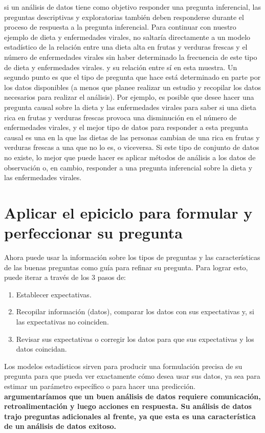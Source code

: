 \documentclass[10pt]{book}
\begin{document}
si un análisis de datos tiene como objetivo responder una pregunta inferencial, las preguntas descriptivas y exploratorias también deben responderse durante el proceso de respuesta a la pregunta inferencial. Para continuar con nuestro ejemplo de dieta y enfermedades virales, no saltaría directamente a un modelo estadístico de la relación entre una dieta alta en frutas y verduras frescas y el número de enfermedades virales sin haber determinado la frecuencia de este tipo de dieta y enfermedades virales. y su relación entre sí en esta muestra. Un segundo punto es que el tipo de pregunta que hace está determinado en parte por los datos disponibles (a menos que planee realizar un estudio y recopilar los datos necesarios para realizar el análisis). Por ejemplo, es posible que desee hacer una pregunta causal sobre la dieta y las enfermedades virales para saber si una dieta rica en frutas y verduras frescas provoca una disminución en el número de enfermedades virales, y el mejor tipo de datos para responder a esta pregunta causal es una en la que las dietas de las personas cambian de una rica en frutas y verduras frescas a una que no lo es, o viceversa. Si este tipo de conjunto de datos no existe, lo mejor que puede hacer es aplicar métodos de análisis a los datos de observación o, en cambio, responder a una pregunta inferencial sobre la dieta y las enfermedades virales.

\section{Aplicar el epiciclo para formular y perfeccionar su pregunta}
Ahora puede usar la información sobre los tipos de preguntas y las características de las buenas preguntas como guía para refinar su pregunta. Para lograr esto, puede iterar a través de los 3 pasos de:
\begin{enumerate}[\bfseries 1.]
\item Establecer expectativas.
\item Recopilar información (datos), comparar los datos con sus expectativas y, si las expectativas no coinciden.
\item Revisar sus expectativas o corregir los datos para que sus expectativas y los datos coincidan.
\end{enumerate}
Los modelos estadísticos sirven para producir una formulación precisa de su pregunta para que pueda ver exactamente cómo desea usar sus datos, ya sea para estimar un parámetro específico o para hacer una predicción.\\
\textbf{argumentaríamos que un buen análisis de datos requiere comunicación, retroalimentación y luego acciones en respuesta. Su análisis de datos trajo preguntas adicionales al frente, ya que esta es una característica de un análisis de datos exitoso.}
\end{document}
